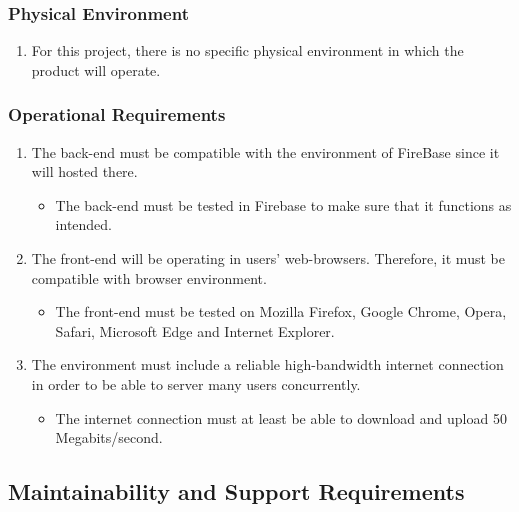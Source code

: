 \documentclass[12pt]{article}
\begin{document}
\subsubsection{Physical Environment}
\begin{enumerate}
    \item For this project, there is no specific physical environment in which the product will operate.
\end{enumerate}

\subsubsection{Operational Requirements}
\begin{enumerate}
    \item The back-end must be compatible with the environment of FireBase since it will hosted there.
    \begin{itemize}
        \item The back-end must be tested in Firebase to make sure that it functions as intended.
    \end{itemize}
    \item The front-end will be operating in users' web-browsers. Therefore, it must be compatible with browser environment.
    \begin{itemize}
        \item The front-end must be tested on Mozilla Firefox, Google Chrome, Opera, Safari, Microsoft Edge and Internet Explorer.
    \end{itemize}
    \item The environment must include a reliable high-bandwidth internet connection in order to be able to server many users concurrently.
    \begin{itemize}
        \item The internet connection must at least be able to download and upload 50 Megabits/second.
    \end{itemize}
\end{enumerate}

\subsection{Maintainability and Support Requirements}
\end{document}
